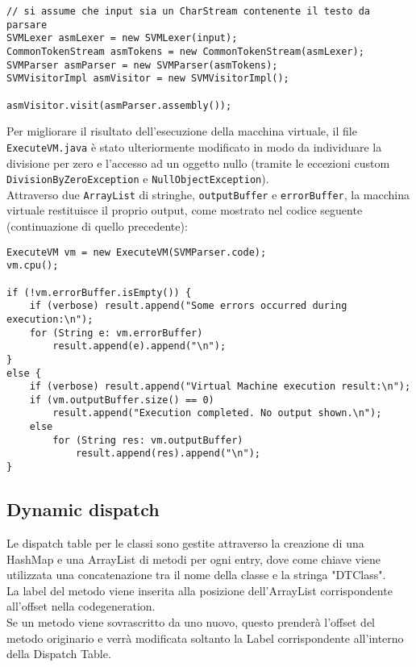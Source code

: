 \documentclass[a4paper]{article}   %
\begin{document}
\begin{lstlisting}[basicstyle=\footnotesize\ttfamily]
// si assume che input sia un CharStream contenente il testo da parsare
SVMLexer asmLexer = new SVMLexer(input);
CommonTokenStream asmTokens = new CommonTokenStream(asmLexer);
SVMParser asmParser = new SVMParser(asmTokens);
SVMVisitorImpl asmVisitor = new SVMVisitorImpl();

asmVisitor.visit(asmParser.assembly());
\end{lstlisting}
Per migliorare il risultato dell'esecuzione della macchina virtuale, il file \lstinline|ExecuteVM.java| è stato ulteriormente modificato in modo da individuare la divisione per zero e l'accesso ad un oggetto nullo (tramite le eccezioni custom \lstinline|DivisionByZeroException| e \lstinline|NullObjectException|).\\
Attraverso due \lstinline|ArrayList| di stringhe, \lstinline|outputBuffer| e \lstinline|errorBuffer|, la macchina virtuale restituisce il proprio output, come mostrato nel codice seguente (continuazione di quello precedente):
\begin{lstlisting}[basicstyle=\footnotesize\ttfamily]
ExecuteVM vm = new ExecuteVM(SVMParser.code);
vm.cpu();

if (!vm.errorBuffer.isEmpty()) {
	if (verbose) result.append("Some errors occurred during execution:\n");
	for (String e: vm.errorBuffer)
		result.append(e).append("\n");
}
else {
	if (verbose) result.append("Virtual Machine execution result:\n");
	if (vm.outputBuffer.size() == 0)
		result.append("Execution completed. No output shown.\n");
	else
		for (String res: vm.outputBuffer)
			result.append(res).append("\n");
}
\end{lstlisting}
\subsection{Dynamic dispatch}
Le dispatch table per le classi sono gestite attraverso la creazione di una HashMap e una ArrayList di metodi per ogni entry, dove come chiave viene utilizzata una concatenazione tra il nome della classe e la stringa "DTClass".
\\
La label del metodo viene inserita alla posizione dell'ArrayList corrispondente all'offset nella codegeneration.
\\
Se un metodo viene sovrascritto da uno nuovo, questo prenderà l'offset del metodo originario e verrà modificata soltanto la Label corrispondente all'interno della Dispatch Table.
\end{document}
